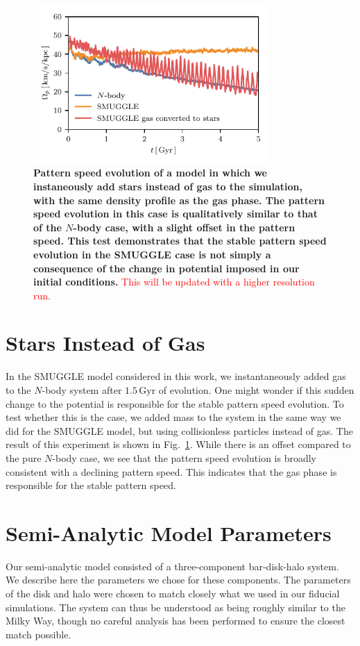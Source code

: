 \documentclass[twocolumn,linenumbers,trackchanges]{aastex631}
\begin{document}
\begin{figure}
    \centering
    \includegraphics[width=9cm]{fig/ps_star.pdf}
    \caption{{\bf Pattern speed evolution of a model in which we instaneously
    add stars instead of gas to the simulation, with the same density profile as
    the gas phase. The pattern speed evolution in this case is qualitatively
    similar to that of the $N$-body case, with a slight offset in the pattern
    speed. This test demonstrates that the stable pattern speed evolution in the
    SMUGGLE case is not simply a consequence of the change in potential imposed
    in our initial conditions.} \textcolor{red}{This will be updated with a
    higher resolution run.}}
\label{fig:ps-star}
\end{figure}

{\bf \section{Stars Instead of Gas}
In the SMUGGLE model considered in this work, we instantaneously added gas to
the $N$-body system after $1.5\,\textrm{Gyr}$ of evolution. One might wonder if
this sudden change to the potential is responsible for the stable pattern speed
evolution. To test whether this is the case, we added mass to the system in the
same way we did for the SMUGGLE model, but using collisionless particles instead
of gas. The result of this experiment is shown in Fig.~\ref{fig:ps-star}. While
there is an offset compared to the pure $N$-body case, we see that the pattern
speed evolution is broadly consistent with a declining pattern speed. This
indicates that the gas phase is responsible for the stable pattern speed.}
\section{Semi-Analytic Model Parameters}
\label{app:sam}
Our semi-analytic model consisted of a three-component bar-disk-halo system. We
describe here the parameters we chose for these components. The parameters of
the disk and halo were chosen to match closely what we used in our fiducial
simulations. The system can thus be understood as being roughly similar to the
Milky Way, though no careful analysis has been performed to ensure the closest
match possible.
\end{document}
